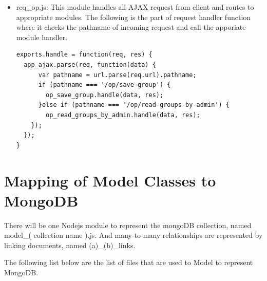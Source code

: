 \begin{itemize}
\item req{\_}op.js: This module handles all AJAX request from client and routes to appropriate modules. The following is the part of request handler function where it checks the pathname of incoming request and call the apporiate module handler.

\begin{lstlisting}
exports.handle = function(req, res) {
  app_ajax.parse(req, function(data) {
      var pathname = url.parse(req.url).pathname;
      if (pathname === '/op/save-group') {
        op_save_group.handle(data, res);
      }else if (pathname === '/op/read-groups-by-admin') {
        op_read_groups_by_admin.handle(data, res);
    });
  });
}
\end{lstlisting}
 
\end{itemize}

\section{Mapping of Model Classes to MongoDB}
There will be one Nodejs module to represent the mongoDB collection, named model{\_}( collection name ).js. And many-to-many relationships are represented by linking documents, named (a){\_}(b){\_}links.

The following list below are the list of files that are used to Model to represent MongoDB.

